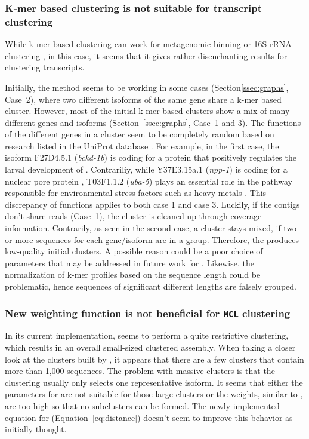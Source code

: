 \documentclass[12pt,a4paper,english]{article}
\begin{document}
	\subsubsection{K-mer based clustering is not suitable for transcript clustering}
	\label{ssec:discussion:karma}
	While k-mer based clustering can work for metagenomic binning \citep{binning:16} or 16S rRNA clustering \citep{16SrRNA:13}, in this case, it seems that it gives rather disenchanting results for clustering transcripts.

	Initially, the method seems to be working in some cases (Section\ref{ssec:graphs}, Case~2), where two different isoforms of the same gene share a k-mer based cluster.
	However, most of the initial k-mer based clusters show a mix of many different genes and isoforms (Section~\ref{ssec:graphs}, Case~1 and 3).
    The functions of the different genes in a cluster seem to be completely random based on research listed in the UniProt database \citep{uniprot:18}.
	For example, in the first case, the isoform F27D4.5.1 (\textit{bckd-1b}) is coding for a protein that positively regulates the larval development of \celegans \citep{F27:16}.
	Contrariliy, while Y37E3.15a.1 (\textit{npp-1}) is coding for a nuclear pore protein \citep{Y37:03}, T03F1.1.2 (\textit{uba-5}) plays an essential role in the pathway responsible for environmental stress factors such as heavy metals \citep{T03:13}. This discrepancy of functions applies to both case 1 and case 3.
	Luckily, if the contigs don't share reads (Case~1), the cluster is cleaned up through coverage information. Contrarily, as seen in the second case, a cluster stays mixed, if two or more sequences for each gene/isoform are in a group. Therefore, the \hdbscan produces low-quality initial clusters.
	A possible reason could be a poor choice of parameters that may be addressed in future work for \karma. Likewise, the normalization of k-mer profiles based on the sequence length could be problematic, hence sequences of significant different lengths are falsely grouped.
	
	\subsubsection{New weighting function is not beneficial for \texttt{MCL} clustering}
	In its current implementation, \karma seems to perform a quite restrictive clustering, which results in an overall small-sized clustered assembly.
	When taking a closer look at the clusters built by \karma, it appears that there are a few clusters that contain more than 1,000 sequences. The problem with massive clusters is that the \mcl clustering usually only selects one representative isoform. It seems that either the parameters for \mcl are not suitable for those large clusters or the weights, similar to \grouper, are too high so that no subclusters can be formed.
	The newly implemented equation for \karma (Equation~\ref{eq:distance}) doesn't seem to improve this behavior as initially thought.
	
\end{document}
